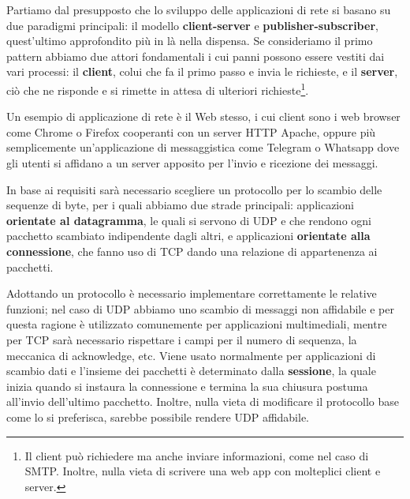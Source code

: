 \noindent Partiamo dal presupposto che lo sviluppo delle applicazioni di rete si basano su due paradigmi principali: il modello \textbf{client-server} e
\textbf{publisher-subscriber}, quest'ultimo approfondito più in là nella dispensa. Se consideriamo il primo pattern abbiamo due attori fondamentali i
cui panni possono essere vestiti dai vari processi: il \textbf{client}, colui che fa il primo passo e invia le richieste, e il \textbf{server}, ciò che
ne risponde e si rimette in attesa di ulteriori richieste\footnote{Il client può richiedere ma anche inviare informazioni, come nel caso di SMTP.
Inoltre, nulla vieta di scrivere una web app con molteplici client e server.}.\par
Un esempio di applicazione di rete è il Web stesso, i cui client sono i web browser come Chrome o Firefox cooperanti con un server HTTP Apache, oppure
più semplicemente un'applicazione di messaggistica come Telegram o Whatsapp dove gli utenti si affidano a un server apposito per l'invio e ricezione dei
messaggi.\par
In base ai requisiti sarà necessario scegliere un protocollo per lo scambio delle sequenze di byte, per i quali abbiamo due strade principali:
applicazioni \textbf{orientate al datagramma}, le quali si servono di UDP e che rendono ogni pacchetto scambiato indipendente dagli altri, e
applicazioni \textbf{orientate alla connessione}, che fanno uso di TCP dando una relazione di appartenenza ai pacchetti.\par
Adottando un protocollo è necessario implementare correttamente le relative funzioni; nel caso di UDP abbiamo uno scambio di messaggi non affidabile e
per questa ragione è utilizzato comunemente per applicazioni multimediali, mentre per TCP sarà necessario rispettare i campi per il numero di sequenza,
la meccanica di acknowledge, etc. Viene usato normalmente per applicazioni di scambio dati e l'insieme dei pacchetti è determinato dalla
\textbf{sessione}, la quale inizia quando si instaura la connessione e termina la sua chiusura postuma all'invio dell'ultimo pacchetto. Inoltre, nulla
vieta di modificare il protocollo base come lo si preferisca, sarebbe possibile rendere UDP affidabile.\newline

